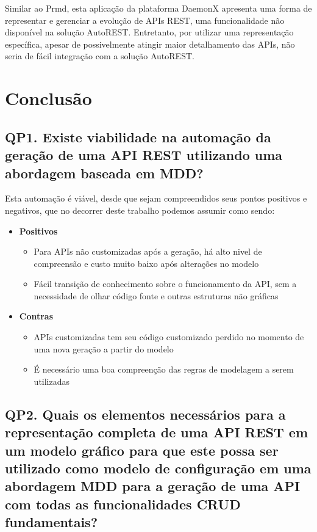 Similar ao Prmd, esta aplicação da plataforma DaemonX apresenta uma forma de representar e gerenciar a evolução de APIs REST, uma funcionalidade não disponível na solução AutoREST. Entretanto, por utilizar uma representação específica, apesar de possivelmente atingir maior detalhamento das APIs, não seria de fácil integração com a solução AutoREST.


\section{Conclusão}

\subsection{QP1. Existe viabilidade na automação da geração de uma API REST utilizando uma abordagem baseada em MDD?}

Esta automação é viável, desde que sejam compreendidos seus pontos positivos e negativos, que no decorrer deste trabalho podemos assumir como sendo:
\begin{itemize}
	\item \textbf{Positivos}
	\begin{itemize}
		\item Para APIs não customizadas após a geração, há alto nivel de compreensão e custo muito baixo após alterações no modelo
		\item Fácil transição de conhecimento sobre o funcionamento da API, sem a necessidade de olhar código fonte e outras estruturas não gráficas
	\end{itemize}
	\item \textbf{Contras}
	\begin{itemize}
		\item APIs customizadas tem seu código customizado perdido no momento de uma nova geração a partir do modelo
		\item É necessário uma boa compreenção das regras de modelagem a serem utilizadas
	\end{itemize}
\end{itemize}

\subsection{QP2. Quais os elementos necessários para a representação completa de uma API REST em um modelo gráfico para que este possa ser utilizado como modelo de configuração em uma abordagem MDD para a geração de uma API com todas as funcionalidades CRUD fundamentais?}

